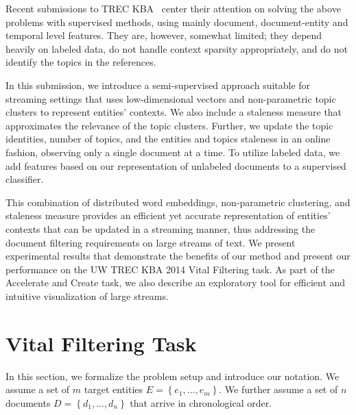 \documentclass{article}
\begin{document}
Recent submissions to TREC KBA~\cite{xitong13, bouvier13, efron13, zhang13, bellogin13} center their attention on solving the above problems with supervised methods, using mainly document, document-entity and temporal level features.
They are, however, somewhat limited; they depend heavily on labeled data, do not handle context sparsity appropriately, and do not identify the topics in the references. %


In this submission, we introduce a semi-supervised approach suitable for streaming settings that uses low-dimensional vectors and non-parametric topic clusters to represent entities' contexts. We also include a staleness measure that approximates the relevance of the topic clusters. %
Further, we update the topic identities, number of topics, and the entities and topics staleness in an online fashion, observing only a single document at a time.
To utilize labeled data, we add features based on our representation of unlabeled documents to a supervised classifier.

This combination of distributed word embeddings, non-parametric clustering, and staleness measure provides an efficient yet accurate representation of entities' contexts that can be updated in a streaming manner, thus addressing the document filtering requirements on large streams of text.
We present experimental results that demonstrate the benefits of our method and present our performance on the UW TREC KBA 2014 Vital Filtering task.
As part of the Accelerate and Create task, we also describe an exploratory tool for efficient and intuitive visualization of large streams.

\section{Vital Filtering Task}
\label{background}

In this section, we formalize the problem setup and introduce our notation. 
We assume a set of $m$ target entities $E = \left\{ {e_1, ..., e_m}\right\}$. We further assume a set of $n$ documents $D = \left\{ {d_{1}, ..., d_{n}}\right\}$ that arrive in chronological order. 
 
\end{document}
